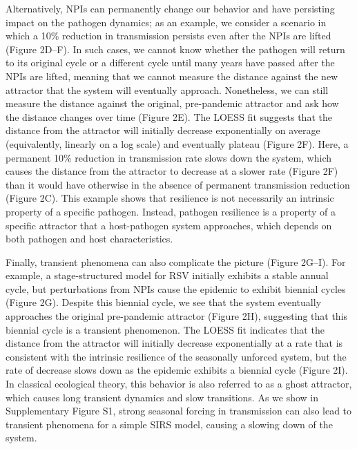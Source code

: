 \documentclass[12pt]{article}
\newcommand{\comment}{\showcomment}
\newcommand{\showcomment}[3]{\textcolor{#1}{\textbf{[#2: }\textsl{#3}\textbf{]}}}
\newcommand{\swp}[1]{\comment{magenta}{SWP}{#1}}
\begin{document}
Alternatively, NPIs can permanently change our behavior and have persisting impact on the pathogen dynamics; 
as an example, we consider a scenario in which a 10\% reduction in transmission persists even after the NPIs are lifted (Figure 2D--F).
In such cases, we cannot know whether the pathogen will return to its original cycle or a different cycle until many years have passed after the NPIs are lifted, meaning that we cannot measure the distance against the new attractor that the system will eventually approach.
Nonetheless, we can still measure the distance against the original, pre-pandemic attractor and ask how the distance changes over time (Figure 2E).
The LOESS fit suggests that the distance from the attractor will initially decrease exponentially on average (equivalently, linearly on a log scale) and eventually plateau (Figure 2F).
Here, a permanent 10\% reduction in transmission rate slows down the system, which causes the distance from the attractor to decrease at a slower rate (Figure 2F) than it would have otherwise in the absence of permanent transmission reduction (Figure 2C).
This example shows that resilience is not necessarily an intrinsic property of a specific pathogen.
Instead, pathogen resilience is a property of a specific attractor that a host-pathogen system approaches, which depends on both pathogen and host characteristics.

Finally, transient phenomena can also complicate the picture (Figure 2G--I).
For example, a stage-structured model for RSV initially exhibits a stable annual cycle, but perturbations from NPIs cause the epidemic to exhibit biennial cycles (Figure 2G).
Despite this biennial cycle, we see that the system eventually approaches the original pre-pandemic attractor (Figure 2H), suggesting that this biennial cycle is a transient phenomenon.
The LOESS fit indicates that the distance from the attractor will initially decrease exponentially at a rate that is consistent with the intrinsic resilience of the seasonally unforced system, but the rate of decrease slows down as the epidemic exhibits a biennial cycle (Figure 2I).
In classical ecological theory, this behavior is also referred to as a ghost attractor, which causes long transient dynamics and slow transitions.
As we show in Supplementary Figure S1, strong seasonal forcing in transmission can also lead to transient phenomena for a simple SIRS model, causing a slowing down of the system.
\end{document}
